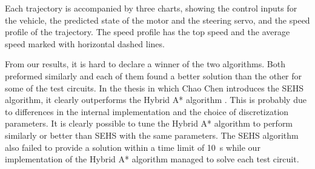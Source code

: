 Each trajectory is accompanied by three charts, showing the control inputs for the vehicle, the predicted state of the motor and the steering servo, and the speed profile of the trajectory. The speed profile has the top speed and the average speed marked with horizontal dashed lines.

From our results, it is hard to declare a winner of the two algorithms. Both preformed similarly and each of them found a better solution than the other for some of the test circuits. In the thesis in which Chao Chen introduces the \gls{SEHS} algorithm, it clearly outperforms the Hybrid A* algorithm \cite{SEHS}. This is probably due to differences in the internal implementation and the choice of discretization parameters. It is clearly possible to tune the Hybrid A* algorithm to perform similarly or better than \gls*{SEHS} with the same parameters. The \gls*{SEHS} algorithm also failed to provide a solution within a time limit of \SI{10}{\second} while our implementation of the Hybrid A* algorithm managed to solve each test circuit.

